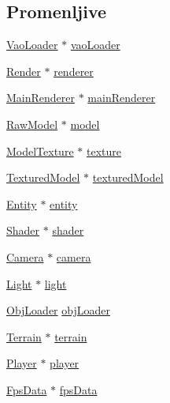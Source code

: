 \subsection*{Promenljive}
\begin{DoxyCompactItemize}
\item 
\hyperlink{classcore_1_1VaoLoader}{Vao\+Loader} $\ast$ \hyperlink{namespacecore_a78dd24784c415d3759a0f71b8f4f9f81}{vao\+Loader}
\item 
\hyperlink{classcore_1_1Render}{Render} $\ast$ \hyperlink{namespacecore_a4f2740ccbefd3bb34c624a8c99d6446d}{renderer}
\item 
\hyperlink{classcore_1_1MainRenderer}{Main\+Renderer} $\ast$ \hyperlink{namespacecore_a01adfda2bbace85dc243e5fba0d93b52}{main\+Renderer}
\item 
\hyperlink{classmodel_1_1RawModel}{Raw\+Model} $\ast$ \hyperlink{namespacecore_aa1479d4ed4dadbfe085b26662122b68a}{model}
\item 
\hyperlink{classtexture_1_1ModelTexture}{Model\+Texture} $\ast$ \hyperlink{namespacecore_a0738503bf610d37d44b4938dc024bfcc}{texture}
\item 
\hyperlink{classmodel_1_1TexturedModel}{Textured\+Model} $\ast$ \hyperlink{namespacecore_ad4d5c25548862489d6a237342748ad74}{textured\+Model}
\item 
\hyperlink{classentity_1_1Entity}{Entity} $\ast$ \hyperlink{namespacecore_aa710c0ea388433d2d80d1d1c67582eda}{entity}
\item 
\hyperlink{classshader_1_1Shader}{Shader} $\ast$ \hyperlink{namespacecore_adf2f7f5f951bd01b06d6c792d7bf301b}{shader}
\item 
\hyperlink{classentity_1_1Camera}{Camera} $\ast$ \hyperlink{namespacecore_a9d645c490b142886301256f6cf9c65c2}{camera}
\item 
\hyperlink{classentity_1_1Light}{Light} $\ast$ \hyperlink{namespacecore_a2324d96000e7c6d42570a0577e8f070b}{light}
\item 
\hyperlink{classcore_1_1ObjLoader}{Obj\+Loader} \hyperlink{namespacecore_abf1a2ebbee224aa2f7a35148ebcac1fb}{obj\+Loader}
\item 
\hyperlink{classterrain_1_1Terrain}{Terrain} $\ast$ \hyperlink{namespacecore_ac45da6f80dac9bead5c9310c27897f15}{terrain}
\item 
\hyperlink{classentity_1_1Player}{Player} $\ast$ \hyperlink{namespacecore_a8130d7cf3bb04bc517651bc3855f8c0f}{player}
\item 
\hyperlink{classutility_1_1FpsData}{Fps\+Data} $\ast$ \hyperlink{namespacecore_a5d5106eb67b679c9260ebe0a9faf14db}{fps\+Data}

\end{DoxyCompactItemize}
